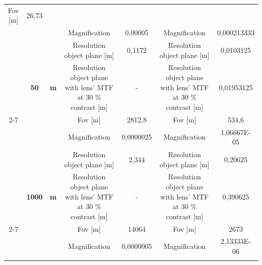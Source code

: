 \begin{table}[H]
{\begin{tabular}{ccc|cc|cc|}
  \cellcolor[HTML]{EFEFEF}Fov {[}m{]} &
  \cellcolor[HTML]{EFEFEF}26,73 \\
\multicolumn{1}{|c|}{} &
  \cellcolor[HTML]{EFEFEF} &
  \cellcolor[HTML]{EFEFEF} &
  Magnification &
  0,00005 &
  Magnification &
  0,000213333 \\
\multicolumn{1}{|c|}{} &
  \cellcolor[HTML]{EFEFEF} &
  \cellcolor[HTML]{EFEFEF} &
  \cellcolor[HTML]{EFEFEF}Resolution object plane {[}m{]} &
  \cellcolor[HTML]{EFEFEF}0,1172 &
  \cellcolor[HTML]{EFEFEF}Resolution object plane {[}m{]} &
  \cellcolor[HTML]{EFEFEF}0,0103125 \\
\multicolumn{1}{|c|}{} &
  \multirow{-4}{*}{\cellcolor[HTML]{EFEFEF}\textbf{50}} &
  \multirow{-4}{*}{\cellcolor[HTML]{EFEFEF}\textbf{m}} &
  Resolution object plane with lens' MTF at 30 \% contrast {[}m{]} &
  - &
  Resolution object plane with lens' MTF at 30 \% contrast {[}m{]} &
  0,01953125 \\ \cline{2-7} 
\multicolumn{1}{|c|}{} &
  \cellcolor[HTML]{EFEFEF} &
  \cellcolor[HTML]{EFEFEF} &
  \cellcolor[HTML]{EFEFEF}Fov {[}m{]} &
  \cellcolor[HTML]{EFEFEF}2812,8 &
  \cellcolor[HTML]{EFEFEF}Fov {[}m{]} &
  \cellcolor[HTML]{EFEFEF}534,6 \\
\multicolumn{1}{|c|}{} &
  \cellcolor[HTML]{EFEFEF} &
  \cellcolor[HTML]{EFEFEF} &
  Magnification &
  0,0000025 &
  Magnification &
  1,06667E-05 \\
\multicolumn{1}{|c|}{} &
  \cellcolor[HTML]{EFEFEF} &
  \cellcolor[HTML]{EFEFEF} &
  \cellcolor[HTML]{EFEFEF}Resolution object plane {[}m{]} &
  \cellcolor[HTML]{EFEFEF}2,344 &
  \cellcolor[HTML]{EFEFEF}Resolution object plane {[}m{]} &
  \cellcolor[HTML]{EFEFEF}0,20625 \\
\multicolumn{1}{|c|}{} &
  \multirow{-4}{*}{\cellcolor[HTML]{EFEFEF}\textbf{1000}} &
  \multirow{-4}{*}{\cellcolor[HTML]{EFEFEF}\textbf{m}} &
  Resolution object plane with lens' MTF at 30 \% contrast {[}m{]} &
  - &
  Resolution object plane with lens' MTF at 30 \% contrast {[}m{]} &
  0,390625 \\ \cline{2-7} 
\multicolumn{1}{|c|}{} &
  \cellcolor[HTML]{EFEFEF} &
  \cellcolor[HTML]{EFEFEF} &
  \cellcolor[HTML]{EFEFEF}Fov {[}m{]} &
  \cellcolor[HTML]{EFEFEF}14064 &
  \cellcolor[HTML]{EFEFEF}Fov {[}m{]} &
  \cellcolor[HTML]{EFEFEF}2673 \\
\multicolumn{1}{|c|}{} &
  \cellcolor[HTML]{EFEFEF} &
  \cellcolor[HTML]{EFEFEF} &
  Magnification &
  0,0000005 &
  Magnification &
  2,13333E-06 \\
\multicolumn{1}{|c|}{} &
  \cellcolor[HTML]{EFEFEF} &

\end{tabular}}
\end{table}
